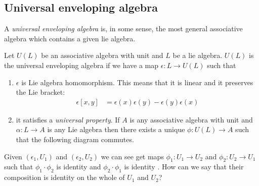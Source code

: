 \subsection{Universal enveloping algebra}
\label{sub:universal_enveloping_algebra}

A \emph{universal enveloping algebra} is, in some sense, the most general associative algebra which contains a given lie algebra. 

Let $U(L)$ be an associative algebra with unit and $L$ be a lie algebra. $U(L)$ is the universal enveloping algebra if we have a map $\epsilon: L\to U(L)$ such that
\begin{enumerate}
    \makethislistcompact
    \item $\epsilon$ is Lie algebra homomorphism. This means that it is linear and it preserves the Lie bracket:
        \begin{align}
            \epsilon[x,y] &= \epsilon(x)\epsilon(y) - \epsilon(y) \epsilon(x)
        \end{align}
    \item it satisfies a \emph{universal property}. If $A$ is any associative algebra with unit and $\alpha: L \to A $ is any Lie algebra then there exists a unique $\phi: U(L)\to A$ such that the following diagram commutes.
        \begin{center}
        \end{center}
\end{enumerate}
\begin{insight}
    Given $(\epsilon_1, U_1)$ and $(\epsilon_2,U_2)$ we can see get maps $\phi_1: U_1\to U_2$  and $\phi_2: U_2\to U_1$ such that 
    $\phi_1\cdot\phi_2$ is identity  and 
    $\phi_2\cdot\phi_1$ is identity . How can we say that their composition is identity on the whole of $U_1$ and $U_2$?

\end{insight}
            





